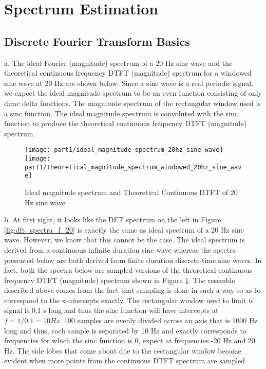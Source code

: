 \section{Spectrum Estimation}

\subsection{Discrete Fourier Transform Basics}

\noindent{}a. The ideal Fourier (magnitude) spectrum of a 20 Hz sine wave and the theoretical continuous frequency DTFT (magnitude) spectrum for a windowed sine wave at 20 Hz are shown below. Since a sine wave is a real periodic signal, we expect the ideal magnitude spectrum to be an even function consisting of only dirac delta functions. The magnitude spectrum of the rectangular window used is a sinc function. The ideal magnitude spectrum is convoluted with the sinc function to produce the theoretical continuous frequency DTFT (magnitude) spectrum. 

\begin{figure}[H]
\centering{}
\texttt{[image: part1/ideal\_magnitude\_spectrum\_20hz\_sine\_wave]}
\texttt{[image: part1/theoretical\_magnitude\_spectrum\_windowed\_20hz\_sine\_wave]}
\label{fig:ideal_and_theoretical_spectra_f_20}
\caption{Ideal magnitude spectrum and Theoretical Continuous DTFT of 20 Hz sine wave}
\end{figure}

\noindent{}b. At first sight, it looks like the DFT spectrum on the left in Figure \ref{fig:dft_spectra_f_20} is exactly the same as ideal spectrum of a 20 Hz sine wave. However, we know that this cannot be the case. The ideal spectrum is derived from a continuous infinite duration sine wave whereas the spectra presented below are both derived from finite duration discrete-time sine waves. In fact, both the spectra below are sampled versions of the theoretical continuous frequency DTFT (magnitude) spectrum shown in Figure \ref{fig:ideal_and_theoretical_spectra_f_20}. The resemble described above comes from the fact that sampling is done in such a way so as to correspond to the x-intercepts exactly. The rectangular window used to limit is signal is 0.1 s long and thus the sinc function will have intercepts at $f=1/0.1=10 Hz$. 100 samples are evenly divided across an axis that is 1000 Hz long and thus, each sample is separated by 10 Hz and exactly corresponds to frequencies for which the sinc function is 0, expect at frequencies -20 Hz and 20 Hz. The side lobes that come about due to the rectangular window become evident when more points from the continuous DTFT spectrum are sampled.

